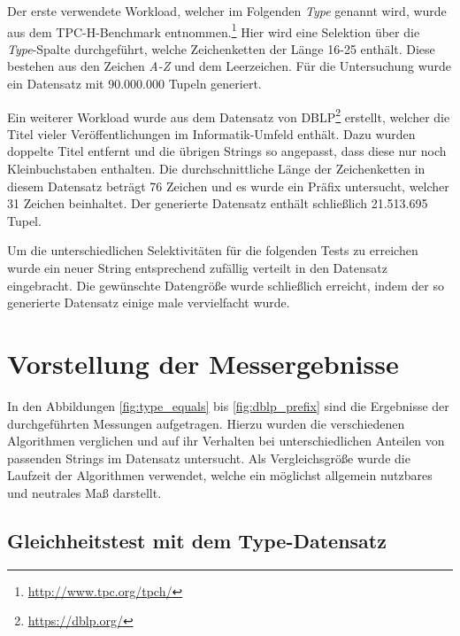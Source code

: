 Der erste verwendete Workload, welcher im Folgenden \emph{Type} genannt wird, wurde aus dem TPC-H-Benchmark entnommen.\footnote{\url{http://www.tpc.org/tpch/}}
Hier wird eine Selektion über die \emph{Type}-Spalte durchgeführt, welche Zeichenketten der Länge 16-25 enthält.
Diese bestehen aus den Zeichen \emph{A-Z} und dem Leerzeichen.
Für die Untersuchung wurde ein Datensatz mit 90.000.000 Tupeln generiert.

Ein weiterer Workload wurde aus dem Datensatz von DBLP\footnote{\url{https://dblp.org/}} erstellt, welcher die Titel vieler Veröffentlichungen im Informatik-Umfeld enthält.
Dazu wurden doppelte Titel entfernt und die übrigen Strings so angepasst, dass diese nur noch Kleinbuchstaben enthalten.
Die durchschnittliche Länge der Zeichenketten in diesem Datensatz beträgt 76 Zeichen und es wurde ein Präfix untersucht, welcher 31 Zeichen beinhaltet.
Der generierte Datensatz enthält schließlich 21.513.695 Tupel.

Um die unterschiedlichen Selektivitäten für die folgenden Tests zu erreichen wurde ein neuer String entsprechend zufällig verteilt in den Datensatz eingebracht.
Die gewünschte Datengröße wurde schließlich erreicht, indem der so generierte Datensatz einige male vervielfacht wurde.

\section{Vorstellung der Messergebnisse}

In den Abbildungen \ref{fig:type_equals} bis \ref{fig:dblp_prefix} sind die Ergebnisse der durchgeführten Messungen aufgetragen.
Hierzu wurden die verschiedenen Algorithmen verglichen und auf ihr Verhalten bei unterschiedlichen Anteilen von passenden Strings im Datensatz untersucht.
Als Vergleichsgröße wurde die Laufzeit der Algorithmen verwendet, welche ein möglichst allgemein nutzbares und neutrales Maß darstellt.

\subsection{Gleichheitstest mit dem Type-Datensatz}

